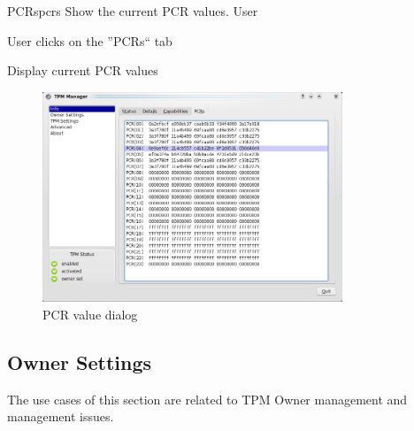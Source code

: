\documentclass[
  american        %
]{sirrixreport}
\begin{document}
\begin{usecase}{PCRs}{pcrs}
\ucdesc Show the current PCR values.
\ucactors  User
\ucnormal 
 \item User clicks on the ''PCRs`` tab
 \item Display current PCR values
\ucendflow 
\end{usecase}

\begin{figure}[h]
 \centering
 \includegraphics[width=0.8\textwidth]{images/uc40.jpg}
 \caption{PCR value dialog }
\end{figure}
\clearpage

\subsection{Owner Settings}
The use cases of this section are related to TPM Owner management and \SRK management issues.
\end{document}
